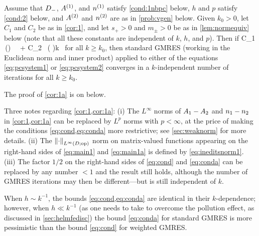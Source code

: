 \noindent Assume that $D_{-}$, ${A}^{(1)}$, and ${n}^{(1)}$ satisfy \cref{cond:1nbpc} below, $h$ and $p$ satisfy \cref{cond:2} below, and ${A}^{(2)}$ and ${n}^{(2)}$ are as in \cref{prob:vgen} below. Given $k_0>0$,
let $C_1$ and $C_2$ be as in \cref{cor:1}, and let $s_{+}>0$ and $m_{\pm}>0$ be as in \cref{lem:normequiv} below (note that all these constants are independent of $k$, $h$, and $p$). Then if 
\beq\label{eq:conda}
 C_1 \,\left(\right) \, \,
\NLiDop{\Aso-\Ast} + C_2 \, \left( \right)k \, \NLiDRR{\nso-\nst}
\leq {}
\eeq
for all $k\geq k_0$, then standard GMRES (working in the Euclidean norm and inner product) applied to either of the equations \cref{eq:pcsystem1} or \cref{eq:pcsystem2}
 converges in a $k$-independent number of iterations for all $k\geq k_0$.
 \enth

 The proof of \cref{cor:1a} is on  below.

Three notes regarding \cref{cor:1,cor:1a}: (i) The $L^\infty$ norms of $A_{1}-A_{2}$ and $n_{1}-n_{2}$ in \cref{cor:1,cor:1a} can be replaced by $L^p$ norms with $p < \infty$, at the price of making the conditions \cref{eq:cond,eq:conda} more restrictive; see \cref{sec:weaknorm} for more details. (ii) The $\NLiDop{\cdot}$ norm on matrix-valued functions appearing on the right-hand sides of \cref{eq:main1} and \cref{eq:main1a} is defined by \cref{eq:ineditsnorm1}.
(iii) The factor $1/2$ on the right-hand sides of \cref{eq:cond} and \cref{eq:conda} can be replaced by any number $<1$ and the result still holds, although the number of GMRES iterations may then be different---but is still independent of $k$.

\bre
When $h\sim  k^{-1}$, the bounds \cref{eq:cond,eq:conda} are identical in their $k$-dependence; however, when $h\ll k^{-1}$ (as one needs to take to overcome the pollution effect, as discussed in \cref{sec:helmfedisc}) the bound \cref{eq:conda} for standard GMRES is more pessimistic than the bound \cref{eq:cond} for weighted GMRES.
\ere

